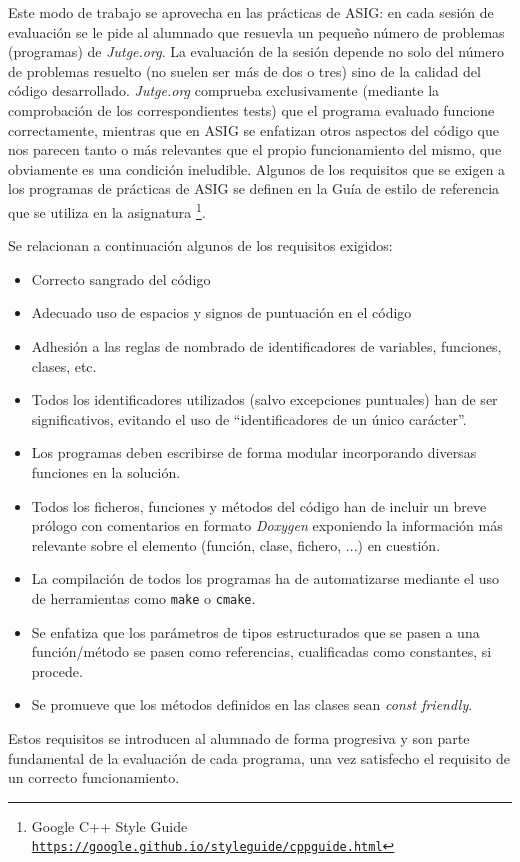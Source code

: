 \documentclass[twocolumn,twoside,a4paper, 10pt]{article}
\newcommand{\jutge}{\textit{Jutge.org}{}}           %
\begin{document}
Este modo de trabajo se aprovecha en las prácticas de ASIG: en cada sesión de evaluación se le pide al alumnado
que resuevla un pequeño número de problemas (programas) de \jutge{}.
La evaluación de la sesión depende no solo del número de problemas resuelto (no suelen ser más de dos o tres)
sino de la calidad del código desarrollado.
\jutge{} comprueba exclusivamente (mediante la comprobación de los correspondientes tests) que el programa evaluado 
funcione correctamente, mientras que en ASIG se enfatizan otros aspectos del código que nos parecen tanto o más 
relevantes que el propio funcionamiento del mismo, que obviamente es una condición ineludible.
Algunos de los requisitos que se exigen a los programas de prácticas de ASIG se definen en la Guía de estilo de 
referencia que se utiliza en la asignatura 
\footnote{Google C++ Style Guide\\ \href{https://google.github.io/styleguide/cppguide.html}{\scriptsize{\texttt{https://google.github.io/styleguide/cppguide.html}}}}.

Se relacionan a continuación algunos de los requisitos exigidos:
\begin{itemize}
\item Correcto sangrado del código
\item Adecuado uso de espacios y signos de puntuación en el código
\item Adhesión a las reglas de nombrado de identificadores de variables, funciones, clases, etc.
\item Todos los identificadores utilizados (salvo excepciones puntuales) han de ser significativos, evitando el
      uso de ``identificadores de un único carácter''.
\item Los programas deben escribirse de forma modular incorporando diversas funciones en la solución.
\item Todos los ficheros, funciones y métodos del código han de incluir un breve prólogo con comentarios en
      formato \textit{Doxygen} exponiendo la información más relevante sobre el elemento (función, clase, fichero, ...) en
      cuestión.
\item La compilación de todos los programas ha de automatizarse mediante el uso de herramientas como \texttt{make} o \texttt{cmake}.
\item Se enfatiza que los parámetros de tipos estructurados que se pasen a una función/método se pasen como referencias,
      cualificadas como constantes, si procede.
\item Se promueve que los métodos definidos en las clases sean \textit{const friendly}.
\end{itemize}
Estos requisitos se introducen al alumnado de forma progresiva y son parte fundamental de la evaluación de cada programa, 
una vez satisfecho el requisito de un correcto funcionamiento.
\end{document}
